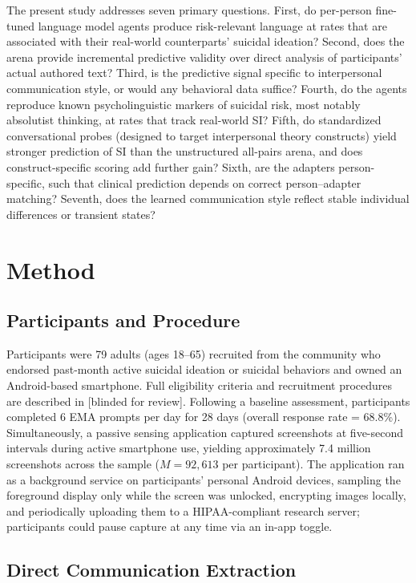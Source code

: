 \documentclass[review,12pt,authoryear]{elsarticle}
\begin{document}
The present study addresses seven primary questions. First, do per-person fine-tuned language model agents produce risk-relevant language at rates that are associated with their real-world counterparts' suicidal ideation? Second, does the arena provide incremental predictive validity over direct analysis of participants' actual authored text? Third, is the predictive signal specific to interpersonal communication style, or would any behavioral data suffice? Fourth, do the agents reproduce known psycholinguistic markers of suicidal risk, most notably absolutist thinking, at rates that track real-world SI? Fifth, do standardized conversational probes (designed to target interpersonal theory constructs) yield stronger prediction of SI than the unstructured all-pairs arena, and does construct-specific scoring add further gain? Sixth, are the adapters person-specific, such that clinical prediction depends on correct person--adapter matching? Seventh, does the learned communication style reflect stable individual differences or transient states?


\section{Method}

\subsection{Participants and Procedure}

Participants were 79 adults (ages 18--65) recruited from the community who endorsed past-month active suicidal ideation or suicidal behaviors and owned an Android-based smartphone. Full eligibility criteria and recruitment procedures are described in [blinded for review]. Following a baseline assessment, participants completed 6 EMA prompts per day for 28 days (overall response rate = 68.8\%). Simultaneously, a passive sensing application captured screenshots at five-second intervals during active smartphone use, yielding approximately 7.4 million screenshots across the sample ($M = 92{,}613$ per participant). The application ran as a background service on participants' personal Android devices, sampling the foreground display only while the screen was unlocked, encrypting images locally, and periodically uploading them to a HIPAA-compliant research server; participants could pause capture at any time via an in-app toggle.

\subsection{Direct Communication Extraction}
\end{document}
